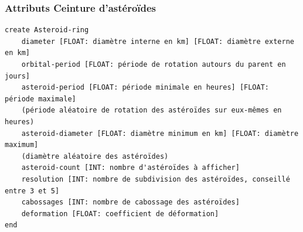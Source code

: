 \documentclass[11pt,a4paper]{article}
\begin{document}
\subsubsection{Attributs Ceinture d'astéroïdes}

\begin{verbatim}
create Asteroid-ring
    diameter [FLOAT: diamètre interne en km] [FLOAT: diamètre externe en km]
    orbital-period [FLOAT: période de rotation autours du parent en jours]
    asteroid-period [FLOAT: période minimale en heures] [FLOAT: période maximale]
    (période aléatoire de rotation des astéroïdes sur eux-mêmes en heures)
    asteroid-diameter [FLOAT: diamètre minimum en km] [FLOAT: diamètre maximum]
    (diamètre aléatoire des astéroïdes)
    asteroid-count [INT: nombre d'astéroïdes à afficher]
    resolution [INT: nombre de subdivision des astéroïdes, conseillé entre 3 et 5]
    cabossages [INT: nombre de cabossage des astéroïdes]
    deformation [FLOAT: coefficient de déformation]
end
\end{verbatim}
\end{document}
